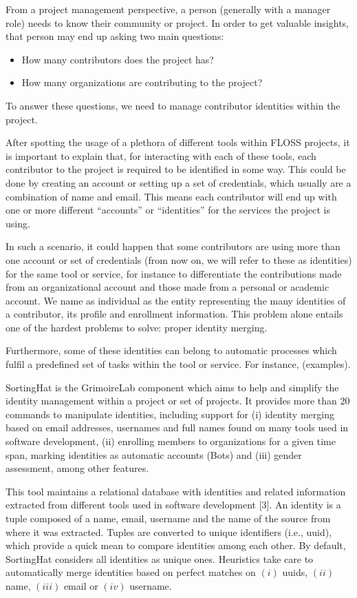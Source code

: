 \documentclass[a4paper, 12pt]{book}
\begin{document}
From a project management perspective, a person (generally with a manager role) needs to know their community or project. In order  to get valuable insights, that person may end up asking two main questions:

\begin{itemize}
    \item How many contributors does the project has?
    \item How many organizations are contributing to the project?
\end{itemize}

To answer these questions, we need to manage contributor identities within the project.

After spotting the usage of a plethora of different tools within FLOSS projects, it is important to explain that, for interacting with each of these tools, each contributor to the project is required to be identified in some way. This could be done by creating an account or setting up a set of credentials, which usually are a combination of name and email. This means each contributor will end up with one or more different “accounts” or “identities” for the services the project is using.

In such a scenario, it could happen that some contributors are using more than one account or set of credentials (from now on, we will refer to these as identities) for the same tool or service, for instance to differentiate the contributions made from an organizational account and those made from a personal or academic account. We name as individual as the entity representing the many identities of a contributor, its profile and enrollment information. This problem alone entails one of the hardest problems to solve: proper identity merging.

Furthermore, some of these identities can belong to automatic processes which fulfil a predefined set of tasks within the tool or service. For instance, (examples). 

SortingHat is the GrimoireLab component which aims to help and simplify the identity management within a project or set of projects. It provides more than 20 commands to manipulate identities, including support for (i) identity merging based on email addresses, usernames and full names found on many tools used in software development, (ii) enrolling members to organizations for a given time span, marking identities as automatic accounts (Bots) and (iii) gender assessment, among other features.

This tool maintains a relational database with identities and related information extracted from different tools used in software development [3]. An identity is a tuple composed of a name, email, username and the name of the source from where it was extracted. Tuples are converted to unique identifiers (i.e., uuid), which provide a quick mean to compare identities among each other. By default, SortingHat considers all identities as unique ones. Heuristics take care to automatically merge identities based on perfect matches on \((i)\) uuids, \((ii)\) name, \((iii)\) email or \((iv)\) username.
\end{document}
